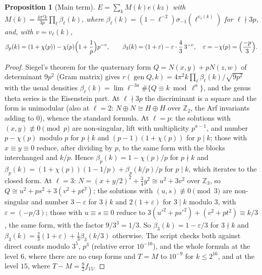 \documentclass[11pt]{amsart}
\newtheorem{proposition}[theorem]{Proposition}
\theoremstyle{remark}
\newcommand{\Z}{\mathbb{Z}}
\newcommand{\e}{\varepsilon}
\begin{document}
\begin{proposition}[Main term]\label{prop:siegel3}
$E=\sum_kM(k)e(kz)$ with $M(k)=\frac{4\pi^2k}{3p}\prod_\ell\beta_\ell(k)$, where $\beta_\ell(k)=(1-\ell^{-2})\sigma_{-1}(\ell^{v_\ell(k)})$ for $\ell\nmid3p$, and, with $v=v_\ell(k)$,
\[
\beta_p(k)=(1+\chi(p))-\chi(p)\Bigl(1+\frac1p\Bigr)p^{-v},\qquad \beta_3(k)=(1+\e)-\e\cdot\frac43\,3^{-v},\quad \e=-\chi(p)=\Bigl(\frac{-p}3\Bigr).
\]
\end{proposition}
\begin{proof}
Siegel's theorem for the quaternary form $Q=N(x,y)+pN(z,w)$ of determinant $9p^2$ (Gram matrix) gives $r(\operatorname{gen}Q,k)=4\pi^2k\prod_\ell\beta_\ell(k)/\sqrt{9p^2}$ with the usual densities $\beta_\ell(k)=\lim\ell^{-3a}\#\{Q\equiv k\bmod\ell^a\}$, and the genus theta series is the Eisenstein part. At $\ell\nmid3p$ the discriminant is a square and the form is unimodular (also at $\ell=2$: $N\oplus N\cong H\oplus H$ over $\Z_2$, the Arf invariants adding to $0$), whence the standard formula. At $\ell=p$: the solutions with $(x,y)\not\equiv0\pmod p$ are non-singular, lift with multiplicity $p^{a-1}$, and number $p-\chi(p)$ modulo $p$ for $p\nmid k$ and $(p-1)(1+\chi(p))$ for $p\mid k$; those with $x\equiv y\equiv0$ reduce, after dividing by $p$, to the same form with the blocks interchanged and $k/p$. Hence $\beta_p(k)=1-\chi(p)/p$ for $p\nmid k$ and $\beta_p(k)=(1+\chi(p))(1-1/p)+\beta_p(k/p)/p$ for $p\mid k$, which iterates to the closed form. At $\ell=3$: $N=(x+y/2)^2+\frac34y^2\cong u^2+3v^2$ over $\Z_3$, so $Q\cong u^2+ps^2+3(v^2+pt^2)$; the solutions with $(u,s)\not\equiv0\pmod3$ are non-singular and number $3-\e$ for $3\nmid k$ and $2(1+\e)$ for $3\mid k$ modulo $3$, with $\e=(-p/3)$; those with $u\equiv s\equiv0$ reduce to $3(u'^2+ps'^2)+(v^2+pt^2)\equiv k/3$, the same form, with the factor $9/3^3=1/3$. So $\beta_3(k)=1-\e/3$ for $3\nmid k$ and $\beta_3(k)=\frac23(1+\e)+\frac13\beta_3(k/3)$ otherwise. The script checks both against direct counts modulo $3^5$, $p^3$ (relative error $10^{-16}$), and the whole formula at the level $6$, where there are no cusp forms and $T=M$ to $10^{-9}$ for $k\le2^{16}$, and at the level $15$, where $T-M=\frac92f_{15}$.
\end{proof}
\end{document}
